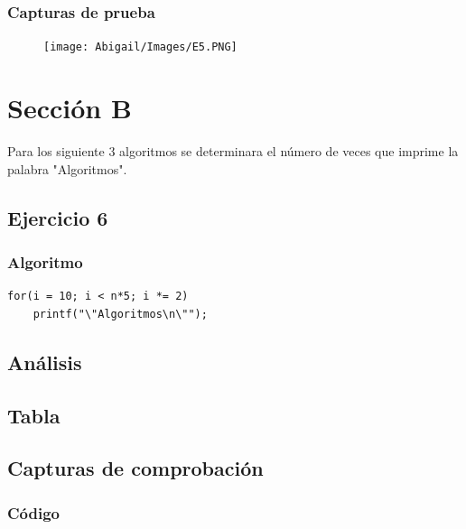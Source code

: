 \documentclass[12pt]{article}
\begin{document}
    		\subsubsection{Capturas de prueba}
				\begin{figure}[h!]
	                \centering
	                \texttt{[image: Abigail/Images/E5.PNG]}
	 		    \end{figure} 

\newpage
	\section{Sección B}
	Para los siguiente 3 algoritmos se determinara el número de veces que imprime la palabra "Algoritmos". 

	    \subsection{Ejercicio 6}
			\subsubsection{Algoritmo}	    
    			\begin{lstlisting}[style=Java]
for(i = 10; i < n*5; i *= 2)
	printf("\"Algoritmos\n\"");    		    
    			\end{lstlisting}
    		
    		\subsection{Análisis}


    		\subsection{Tabla}
	        
	        \subsection{Capturas de comprobación}

	        \subsubsection{Código}
	            \begin{lstlisting}[style=Java]
    		    \end{lstlisting}
\end{document}
